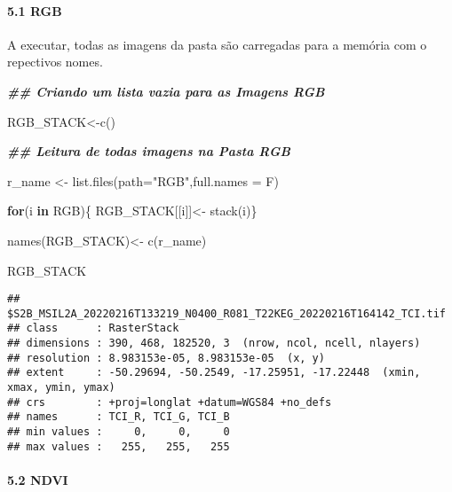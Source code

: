 \documentclass[
]{article}
\newenvironment{Shaded}{\begin{snugshade}}{\end{snugshade}}
\newcommand{\AttributeTok}[1]{\textcolor[rgb]{0.77,0.63,0.00}{#1}}
\newcommand{\ControlFlowTok}[1]{\textcolor[rgb]{0.13,0.29,0.53}{\textbf{#1}}}
\newcommand{\DocumentationTok}[1]{\textcolor[rgb]{0.56,0.35,0.01}{\textbf{\textit{#1}}}}
\newcommand{\FunctionTok}[1]{\textcolor[rgb]{0.00,0.00,0.00}{#1}}
\newcommand{\NormalTok}[1]{#1}
\newcommand{\OtherTok}[1]{\textcolor[rgb]{0.56,0.35,0.01}{#1}}
\newcommand{\StringTok}[1]{\textcolor[rgb]{0.31,0.60,0.02}{#1}}
\begin{document}
\hypertarget{rgb}{%
\paragraph{5.1 RGB}\label{rgb}}

A executar, todas as imagens da pasta são carregadas para a memória com
o repectivos nomes.

\begin{Shaded}
\begin{Highlighting}[]
\DocumentationTok{\#\# Criando um lista vazia para as Imagens RGB}

\NormalTok{RGB\_STACK}\OtherTok{\textless{}{-}}\FunctionTok{c}\NormalTok{() }
\end{Highlighting}
\end{Shaded}

\begin{Shaded}
\begin{Highlighting}[]
\DocumentationTok{\#\# Leitura de todas imagens na Pasta RGB}

\NormalTok{r\_name }\OtherTok{\textless{}{-}} \FunctionTok{list.files}\NormalTok{(}\AttributeTok{path=}\StringTok{"RGB"}\NormalTok{,}\AttributeTok{full.names =}\NormalTok{ F)}

\ControlFlowTok{for}\NormalTok{(i }\ControlFlowTok{in}\NormalTok{ RGB)\{ RGB\_STACK[[i]]}\OtherTok{\textless{}{-}} \FunctionTok{stack}\NormalTok{(i)\} }

\FunctionTok{names}\NormalTok{(RGB\_STACK)}\OtherTok{\textless{}{-}} \FunctionTok{c}\NormalTok{(r\_name)}

\NormalTok{RGB\_STACK}
\end{Highlighting}
\end{Shaded}

\begin{verbatim}
## $S2B_MSIL2A_20220216T133219_N0400_R081_T22KEG_20220216T164142_TCI.tif
## class      : RasterStack 
## dimensions : 390, 468, 182520, 3  (nrow, ncol, ncell, nlayers)
## resolution : 8.983153e-05, 8.983153e-05  (x, y)
## extent     : -50.29694, -50.2549, -17.25951, -17.22448  (xmin, xmax, ymin, ymax)
## crs        : +proj=longlat +datum=WGS84 +no_defs 
## names      : TCI_R, TCI_G, TCI_B 
## min values :     0,     0,     0 
## max values :   255,   255,   255
\end{verbatim}

\hypertarget{ndvi}{%
\paragraph{5.2 NDVI}\label{ndvi}}
\end{document}
